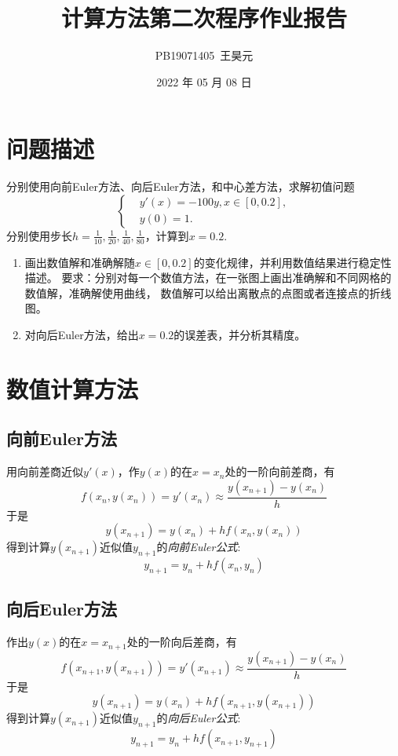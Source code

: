 \documentclass{article}
\title{计算方法第二次程序作业报告}
\author{PB19071405\ 王昊元}
\date{2022 年 05 月 08 日}
\begin{document}
\maketitle

\section{问题描述}

分别使用向前Euler方法、向后Euler方法，和中心差方法，求解初值问题
\[
    \left\{
    \begin{aligned}
        & y'(x) = -100y, x \in [0, 0.2],\\
        & y(0) = 1.
    \end{aligned}
    \right.
\]
分别使用步长$h = \frac{1}{10}, \frac{1}{20}, \frac{1}{40}, \frac{1}{80}$，计算到$x = 0.2$.

\begin{enumerate}
    \item 画出数值解和准确解随$x\in [0, 0.2]$的变化规律，并利用数值结果进行稳定性描述。
    要求：分别对每一个数值方法，在一张图上画出准确解和不同网格的数值解，准确解使用曲线，
    数值解可以给出离散点的点图或者连接点的折线图。
    \item 对向后Euler方法，给出$x = 0.2$的误差表，并分析其精度。
\end{enumerate}

\section{数值计算方法}

\subsection{向前Euler方法}

用向前差商近似$y'(x)$，作$y(x)$的在$x = x_n$处的一阶向前差商，有
\[f(x_n, y(x_n)) = y'(x_n) \approx \frac{y(x_{n+1}) - y(x_n)}{h} \]
于是
\[y(x_{n+1}) = y(x_n) + hf(x_n, y(x_n))\]
得到计算$y(x_{n+1})$近似值$y_{n+1}$的\emph{向前Euler公式}:
\[y_{n+1} = y_n + hf(x_n, y_n)\]

\subsection{向后Euler方法}

作出$y(x)$的在$x = x_{n+1}$处的一阶向后差商，有
\[f(x_{n+1}, y(x_{n+1})) = y'(x_{n+1}) \approx \frac{y(x_{n+1}) - y(x_n)}{h} \]
于是
\[y(x_{n+1}) = y(x_n) + hf(x_{n+1}, y(x_{n+1}))\]
得到计算$y(x_{n+1})$近似值$y_{n+1}$的\emph{向后Euler公式}:
\[y_{n+1} = y_n + hf(x_{n+1}, y_{n+1})\]
\end{document}
